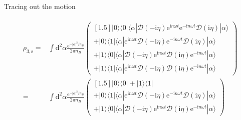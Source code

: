 \documentclass[10pt,fleqn]{article}
\newcommand{\ud}{\mathrm{d}}
\newcommand{\ue}{\mathrm{e}}
\newcommand{\ui}{\mathrm{i}}
\newcommand{\eqar}[1]
{
  \begin{align}
    #1
  \end{align}
}
\newcommand{\abs}[1]{{\left|{#1}\right|}}
\begin{document}
Tracing out the motion
\eqar{
  \begin{split}
    \rho_{3,\mathrm{s}}=
    &\int\ud^2\alpha \frac{\ue^{-\abs{\alpha}^2/n_B}}{2\pi n_B}
      \begin{pmatrix}[1.5]
        |0\rangle\langle0|
        \langle\alpha|\mathcal{D}(-\ui\eta)\ue^{\ui n\omega t}
        \ue^{-\ui n\omega t}\mathcal{D}(\ui\eta)|\alpha\rangle\\
        +|0\rangle\langle1|
        \langle\alpha|\ue^{\ui n\omega t}\mathcal{D}(-\ui\eta)
        \ue^{-\ui n\omega t}\mathcal{D}(\ui\eta)|\alpha\rangle
        \\
        +|1\rangle\langle0|
        \langle\alpha|\mathcal{D}(-\ui\eta)\ue^{\ui n\omega t}
        \mathcal{D}(\ui\eta)\ue^{-\ui n\omega t}|\alpha\rangle
        \\
        +|1\rangle\langle1|
        \langle\alpha|\ue^{\ui n\omega t}\mathcal{D}(-\ui\eta)
        \mathcal{D}(\ui\eta)\ue^{-\ui n\omega t}|\alpha\rangle
      \end{pmatrix}\\
    =&\int\ud^2\alpha \frac{\ue^{-\abs{\alpha}^2/n_B}}{2\pi n_B}
       \begin{pmatrix}[1.5]
         |0\rangle\langle0|
         +|1\rangle\langle1|\\
         +|0\rangle\langle1|
         \langle\alpha|\ue^{\ui n\omega t}\mathcal{D}(-\ui\eta)
         \ue^{-\ui n\omega t}\mathcal{D}(\ui\eta)|\alpha\rangle
         \\
         +|1\rangle\langle0|
         \langle\alpha|\mathcal{D}(-\ui\eta)\ue^{\ui n\omega t}
         \mathcal{D}(\ui\eta)\ue^{-\ui n\omega t}|\alpha\rangle
       \end{pmatrix}
  \end{split}
}
\end{document}
